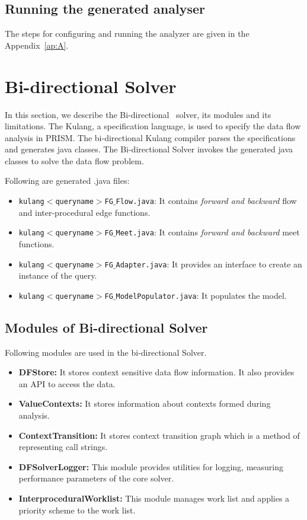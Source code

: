 \documentclass[11pt,a4paper,openright]{report}
\begin{document}
\subsection{Running the generated analyser}
The steps for configuring and running the analyzer are given in the Appendix~\ref{ap:A}.

\section{Bi-directional Solver}
In this section, we describe the Bi-directional~\cite{thesis_v} solver, its modules and its limitations.
The Kulang, a specification language, is used to specify the data flow analysis in PRISM. The bi-directional Kulang compiler parses the specifications
and generates java classes. The Bi-directional Solver invokes the generated java classes to solve the data flow problem.

Following are generated .java files:
\begin{itemize}
 \item \texttt{kulang$<$queryname$>$FG$\_$Flow.java}: It contains \textit{forward and backward} flow and inter-procedural edge functions.  
 \item \texttt{kulang$<$queryname$>$FG$\_$Meet.java}: It contains \textit{forward and backward} meet functions.
 \item \texttt{kulang$<$queryname$>$FG$\_$Adapter.java}: It provides an interface to create an instance of the query. 
 \item \texttt{kulang$<$queryname$>$FG$\_$ModelPopulator.java}: It populates the model.
\end{itemize}


\subsection{Modules of Bi-directional Solver}
Following modules are used in the bi-directional Solver.
\begin{itemize}
 \item \textbf{DFStore:} It stores context sensitive data flow information. It also provides an API to access the data.
 \item \textbf{ValueContexts:} It stores information about contexts formed during analysis.
 \item \textbf{ContextTransition:} It stores context transition graph which is a method of representing call strings.
 \item \textbf{DFSolverLogger:} This module provides utilities for logging, measuring performance parameters of the core solver.
 \item \textbf{InterproceduralWorklist:} This module manages work list and applies a priority scheme to the work list.
\end{itemize}
\end{document}
